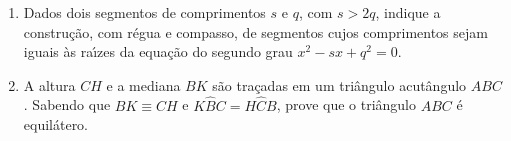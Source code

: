 \documentclass[a4paper,5pt]{amsbook}
\newcommand{\ds}{\displaystyle}
\begin{document}
\begin{enumerate}
\begin{enumerate}
                Dica: $R =
                \ds\frac{a\sqrt{6}}{4}$, onde $a$ \'e a aresta do tetraedro.
        \end{enumerate}

    \vspace{0.5cm}
    \item Dados dois segmentos de comprimentos $s$ e $q$, com $s>2q$, indique a
        constru\c{c}\~ao, com r\'egua e compasso, de segmentos cujos comprimentos sejam
        iguais \`as ra\'{\i}zes da equa\c{c}\~ao do segundo grau $x^2-sx+q^2 = 0$.

    \vspace{0.5cm}
    \item A altura $CH$ e a mediana $BK$ s\~ao tra\c{c}adas em um tri\^angulo
        acut\^angulo $ABC$. Sabendo que $BK \equiv CH$ e $K\hat{B}C = H\hat{C}B$,
        prove que o tri\^angulo $ABC$ \'e equil\'atero.
\end{enumerate}
\end{document}
